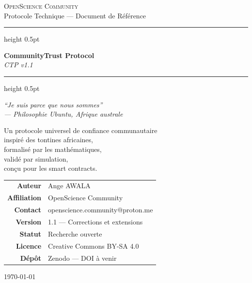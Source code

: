 \documentclass[12pt,a4paper]{article}
\theoremstyle{definition}
\theoremstyle{plain}
\theoremstyle{remark}
\newcommand{\1}{\mathbf{1}}
\begin{document}
\begin{titlepage}
\centering
\vspace*{1.5cm}

{\Large \textsc{OpenScience Community}}\\[0.4cm]
{\small Protocole Technique — Document de Référence}\\[2cm]

\hrule height 0.5pt
\vspace{0.6cm}

{\Huge \textbf{CommunityTrust Protocol}}\\[0.5cm]
{\LARGE \textit{CTP v1.1}}\\[0.3cm]

\vspace{0.4cm}
\hrule height 0.5pt
\vspace{1.2cm}

{\large \textit{``Je suis parce que nous sommes''}}\\[0.2cm]
{\small \textit{--- Philosophie Ubuntu, Afrique australe}}

\vspace{1.5cm}

{\large Un protocole universel de confiance communautaire\\
inspiré des tontines africaines,\\
formalisé par les mathématiques,\\
validé par simulation,\\
conçu pour les smart contracts.}

\vspace{1.5cm}

\begin{tabular}{rl}
\textbf{Auteur}       & Ange AWALA \\
\textbf{Affiliation}  & OpenScience Community \\
\textbf{Contact}      & openscience.community@proton.me \\[0.3cm]
\textbf{Version}      & 1.1 --- Corrections et extensions \\
\textbf{Statut}       & Recherche ouverte \\
\textbf{Licence}      & Creative Commons BY-SA 4.0 \\
\textbf{Dépôt}        & Zenodo --- DOI à venir \\
\end{tabular}

\vfill
{\small \today}
\end{titlepage}
\end{document}
